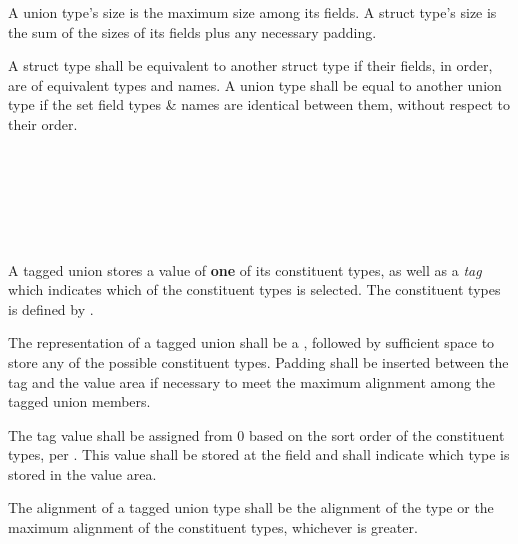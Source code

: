 \specsubsubitem
A union type's size is the maximum size among its fields. A struct type's size
is the sum of the sizes of its fields plus any necessary padding.


\specsubsubitem
A struct type shall be equivalent to another struct type if their fields, in
order, are of equivalent types and names. A union type shall be equal to another
union type if the set field types \& names are identical between them,
without respect to their order.


\begin{grammar}
 \\
	\terminal{(}  \terminal{)} \\

 \\
	 \terminal{|}  \\
	 \terminal{|}  \\
\end{grammar}

\specsubsubitem
A tagged union stores a value of \textbf{one} of its constituent types, as well
as a \textit{tag} which indicates which of the constituent types is selected.
The constituent types is defined by .

\specsubsubitem
The representation of a tagged union shall be a , followed by
sufficient space to store any of the possible constituent types. Padding shall
be inserted between the tag and the value area if necessary to meet the maximum
alignment among the tagged union members.

\specsubsubitem
The tag value shall be assigned from $0$ based on the sort order of the
constituent types, per . This value shall be stored at the
 field and shall indicate which type is stored in the value area.


\specsubsubitem
The alignment of a tagged union type shall be the alignment of the
 type or the maximum alignment of the constituent types, whichever
is greater.

